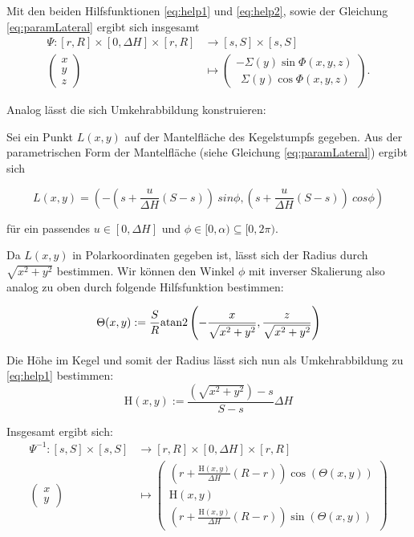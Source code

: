 Mit den beiden Hilfsfunktionen \ref{eq:help1} und \ref{eq:help2}, sowie der Gleichung \ref{eq:paramLateral} ergibt sich insgesamt
\begin{equation}\label{eq:coneToLateral}
\begin{aligned}
\Psi \colon [r,R] \times [0, \Delta H] \times [r,R] &\to [s,S] \times [s,S]\\
\begin{pmatrix}
x \\ y \\ z
\end{pmatrix}  &\mapsto
\begin{pmatrix}
-\Sigma(y)\sin \Phi(x,y,z)\\
 ~~\Sigma(y)\cos\Phi(x,y,z)
\end{pmatrix}.
\end{aligned}
\end{equation}

Analog lässt die sich Umkehrabbildung konstruieren:

Sei ein Punkt $L(x,y)$ auf der Mantelfläche des Kegelstumpfs gegeben. Aus der parametrischen Form der Mantelfläche (siehe Gleichung \ref{eq:paramLateral}) ergibt sich

\[
L(x,y) = (-(s + \frac{u}{\Delta H}(S-s)) ~sin \phi, (s + \frac{u}{\Delta H} (S-s)) ~cos \phi)
\]

für ein passendes $u\in [0, \Delta H]$ und $\phi \in [0, \alpha) \subseteq  [0, 2\pi)$.

Da $L(x,y)$ in Polarkoordinaten gegeben ist, lässt sich der Radius durch $\sqrt{x^2+y^2}$ bestimmen. Wir können den Winkel $\phi$ mit inverser Skalierung also analog zu oben durch folgende Hilfsfunktion bestimmen:

\begin{equation}\label{eq:help3}
\Theta(x,y) := \frac{S}{R} \text{atan2}\left(-\frac{x}{\sqrt{x^2+y^2}}, \frac{z}{\sqrt{x^2+y^2}}\right)
\end{equation}

Die Höhe  im Kegel und somit der Radius lässt sich nun als Umkehrabbildung zu \ref{eq:help1} bestimmen:
\begin{equation}\label{eq:help4}
\mathrm{H}(x,y) := \frac{\left(\sqrt{x^2+y^2}\right) - s}{S - s}\Delta H
\end{equation}

Insgesamt ergibt sich:
\begin{equation}\label{eq:LateralToCone}
\begin{aligned}
\Psi^{-1} \colon  [s,S]\times[s,S] &\to [r,R] \times [0, \Delta H] \times [r,R]\\
\begin{pmatrix}
x \\ y
\end{pmatrix} &\mapsto
\begin{pmatrix}
\left( r + \frac{\mathrm{H}(x,y)}{\Delta H} (R - r)\right)\cos\left(\Theta(x,y) \right) \\
\mathrm{H}(x,y)\\
\left( r + \frac{\mathrm{H}(x,y)}{\Delta H} (R - r)\right)\sin\left(\Theta(x,y) \right)
\end{pmatrix}
\end{aligned}
\end{equation}


